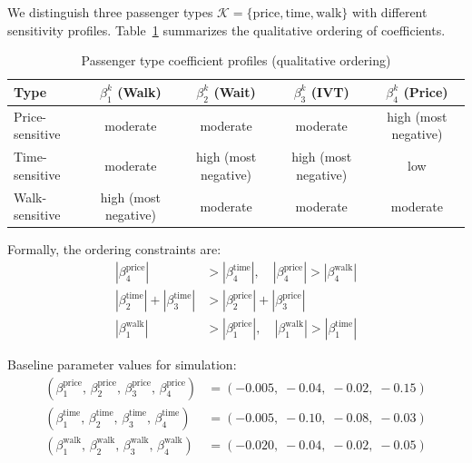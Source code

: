 We distinguish three passenger types $\mathcal{K} = \{\text{price}, \text{time}, \text{walk}\}$
with different sensitivity profiles. Table~\ref{tab:passenger-types} summarizes the
qualitative ordering of coefficients.

\begin{table}[h]
\centering
\caption{Passenger type coefficient profiles (qualitative ordering)}
\label{tab:passenger-types}
\begin{tabular}{lcccc}
\toprule
Type & $\beta_1^k$ (Walk) & $\beta_2^k$ (Wait) & $\beta_3^k$ (IVT) & $\beta_4^k$ (Price) \\
\midrule
Price-sensitive  & moderate & moderate & moderate & high (most negative) \\
Time-sensitive   & moderate & high (most negative) & high (most negative) & low \\
Walk-sensitive   & high (most negative) & moderate & moderate & moderate \\
\bottomrule
\end{tabular}
\end{table}

Formally, the ordering constraints are:
\begin{align}
  |\beta_4^{\text{price}}| &> |\beta_4^{\text{time}}|,\quad |\beta_4^{\text{price}}| > |\beta_4^{\text{walk}}| \label{eq:type-price}\\
  |\beta_2^{\text{time}}| + |\beta_3^{\text{time}}| &> |\beta_2^{\text{price}}| + |\beta_3^{\text{price}}| \label{eq:type-time}\\
  |\beta_1^{\text{walk}}| &> |\beta_1^{\text{price}}|,\quad |\beta_1^{\text{walk}}| > |\beta_1^{\text{time}}| \label{eq:type-walk}
\end{align}

Baseline parameter values for simulation:
\begin{align}
  (\beta_1^{\text{price}},\, \beta_2^{\text{price}},\, \beta_3^{\text{price}},\, \beta_4^{\text{price}})
    &= (-0.005,\; -0.04,\; -0.02,\; -0.15) \label{eq:beta-price}\\
  (\beta_1^{\text{time}},\, \beta_2^{\text{time}},\, \beta_3^{\text{time}},\, \beta_4^{\text{time}})
    &= (-0.005,\; -0.10,\; -0.08,\; -0.03) \label{eq:beta-time}\\
  (\beta_1^{\text{walk}},\, \beta_2^{\text{walk}},\, \beta_3^{\text{walk}},\, \beta_4^{\text{walk}})
    &= (-0.020,\; -0.04,\; -0.02,\; -0.05) \label{eq:beta-walk}
\end{align}


